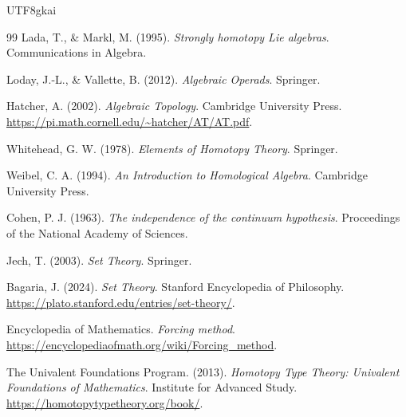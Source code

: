 \documentclass[12pt]{article}
\begin{document}
\begin{CJK*}{UTF8}{gkai}
\begin{thebibliography}{99}
Lada, T., \& Markl, M. (1995).
\newblock \emph{Strongly homotopy Lie algebras}.
\newblock Communications in Algebra.

Loday, J.-L., \& Vallette, B. (2012).
\newblock \emph{Algebraic Operads}.
\newblock Springer.

Hatcher, A. (2002).
\newblock \emph{Algebraic Topology}.
\newblock Cambridge University Press.
\newblock \url{https://pi.math.cornell.edu/~hatcher/AT/AT.pdf}.

Whitehead, G. W. (1978).
\newblock \emph{Elements of Homotopy Theory}.
\newblock Springer.

Weibel, C. A. (1994).
\newblock \emph{An Introduction to Homological Algebra}.
\newblock Cambridge University Press.

Cohen, P. J. (1963).
\newblock \emph{The independence of the continuum hypothesis}.
\newblock Proceedings of the National Academy of Sciences.

Jech, T. (2003).
\newblock \emph{Set Theory}.
\newblock Springer.

Bagaria, J. (2024).
\newblock \emph{Set Theory}.
\newblock Stanford Encyclopedia of Philosophy.
\newblock \url{https://plato.stanford.edu/entries/set-theory/}.

Encyclopedia of Mathematics.
\newblock \emph{Forcing method}.
\newblock \url{https://encyclopediaofmath.org/wiki/Forcing_method}.

The Univalent Foundations Program. (2013).
\newblock \emph{Homotopy Type Theory: Univalent Foundations of Mathematics}.
\newblock Institute for Advanced Study.
\newblock \url{https://homotopytypetheory.org/book/}.

\end{thebibliography}

\end{CJK*}
\end{document}
